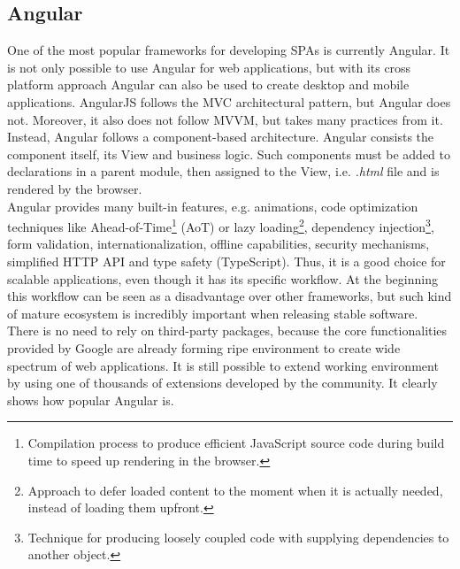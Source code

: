 \documentclass{article} %
\begin{document}
\subsection{Angular}
One of the most popular frameworks for developing SPAs is currently Angular. It is not only possible to use Angular for web applications, but with its cross platform approach Angular can also be used to create desktop and mobile applications. AngularJS follows the MVC architectural pattern, but Angular does not. Moreover, it also does not follow MVVM, but takes many practices from it. Instead, Angular follows a component-based architecture. Angular consists the component itself, its View and business logic. Such components must be added to declarations in a parent module, then assigned to the View, i.e. \textit{.html} file and is rendered by the browser.\\
\newline
Angular provides many built-in features, e.g. animations, code optimization techniques like Ahead-of-Time\footnote{Compilation process to produce efficient JavaScript source code during build time to speed up rendering in the browser.} (AoT) or lazy loading\footnote{Approach to defer loaded content to the moment when it is actually needed, instead of loading them upfront.}, dependency injection\footnote{Technique for producing loosely coupled code with supplying dependencies to another object.}, form validation, internationalization, offline capabilities, security mechanisms, simplified HTTP API and type safety (TypeScript). Thus, it is a good choice for scalable applications, even though it has its specific workflow. At the beginning this workflow can be seen as a disadvantage over other frameworks, but such kind of mature ecosystem is incredibly important when releasing stable software. There is no need to rely on third-party packages, because the core functionalities provided by Google are already forming ripe environment to create wide spectrum of web applications. It is still possible to extend working environment by using one of thousands of extensions developed by the community. It clearly shows how popular Angular is.\\
\end{document}
